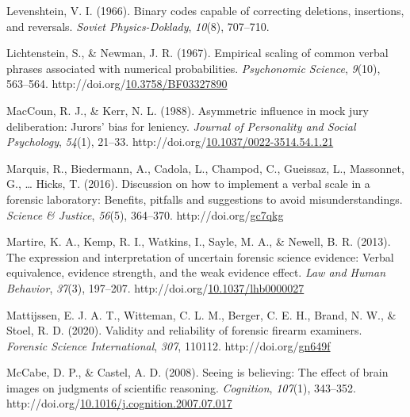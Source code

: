 \documentclass[print]{nuthesis}
\newlength{\cslhangindent}
\newenvironment{CSLReferences}[2]%
{\setlength{\parindent}{0pt}%
\everypar{\setlength{\hangindent}{\cslhangindent}}\ignorespaces}%
{\par}
\begin{document}
\begin{CSLReferences}{1}{0}
\leavevmode{}%
Levenshtein, V. I. (1966). Binary codes capable of correcting deletions, insertions, and reversals. \emph{Soviet Physics-Doklady}, \emph{10}(8), 707--710.

\leavevmode{}%
Lichtenstein, S., \& Newman, J. R. (1967). Empirical scaling of common verbal phrases associated with numerical probabilities. \emph{Psychonomic Science}, \emph{9}(10), 563--564. http://doi.org/\href{https://doi.org/10.3758/BF03327890}{10.3758/BF03327890}

\leavevmode{}%
MacCoun, R. J., \& Kerr, N. L. (1988). Asymmetric influence in mock jury deliberation: {Jurors}' bias for leniency. \emph{Journal of Personality and Social Psychology}, \emph{54}(1), 21--33. http://doi.org/\href{https://doi.org/10.1037/0022-3514.54.1.21}{10.1037/0022-3514.54.1.21}

\leavevmode{}%
Marquis, R., Biedermann, A., Cadola, L., Champod, C., Gueissaz, L., Massonnet, G., \ldots{} Hicks, T. (2016). Discussion on how to implement a verbal scale in a forensic laboratory: {Benefits}, pitfalls and suggestions to avoid misunderstandings. \emph{Science \& Justice}, \emph{56}(5), 364--370. http://doi.org/\href{https://doi.org/gc7qkg}{gc7qkg}

\leavevmode{}%
Martire, K. A., Kemp, R. I., Watkins, I., Sayle, M. A., \& Newell, B. R. (2013). The expression and interpretation of uncertain forensic science evidence: {Verbal} equivalence, evidence strength, and the weak evidence effect. \emph{Law and Human Behavior}, \emph{37}(3), 197--207. http://doi.org/\href{https://doi.org/10.1037/lhb0000027}{10.1037/lhb0000027}

\leavevmode{}%
Mattijssen, E. J. A. T., Witteman, C. L. M., Berger, C. E. H., Brand, N. W., \& Stoel, R. D. (2020). Validity and reliability of forensic firearm examiners. \emph{Forensic Science International}, \emph{307}, 110112. http://doi.org/\href{https://doi.org/gn649f}{gn649f}

\leavevmode{}%
McCabe, D. P., \& Castel, A. D. (2008). Seeing is believing: {The} effect of brain images on judgments of scientific reasoning. \emph{Cognition}, \emph{107}(1), 343--352. http://doi.org/\href{https://doi.org/10.1016/j.cognition.2007.07.017}{10.1016/j.cognition.2007.07.017}


\end{CSLReferences}
\end{document}
